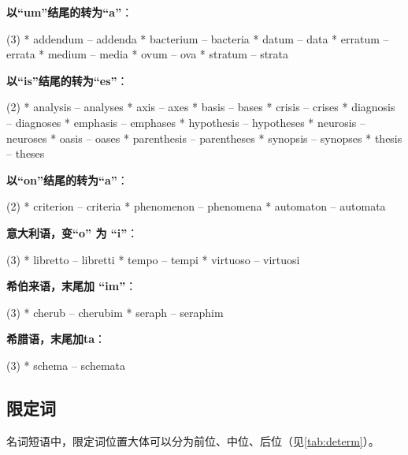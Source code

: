 \begin{description}
  \textbf{以``um''结尾的转为``a''}：
  \begin{taskitem}(3)
    *  addendum -- addenda
    *  bacterium -- bacteria
    *  datum -- data
    *  erratum -- errata
    *  medium -- media
    *  ovum -- ova
    *  stratum -- strata
  \end{taskitem}

  \textbf{以``is''结尾的转为``es''}：
  \begin{taskitem}(2)
    *  analysis -- analyses
    *  axis -- axes
    *  basis -- bases
    *  crisis -- crises
    *  diagnosis -- diagnoses
    *  emphasis -- emphases
    *  hypothesis -- hypotheses
    *  neurosis -- neuroses
    *  oasis -- oases
    *  parenthesis -- parentheses
    *  synopsis -- synopses
    *  thesis -- theses
  \end{taskitem}


  \textbf{以``on''结尾的转为``a''}：
  \begin{taskitem}(2)
    *  criterion -- criteria
    *  phenomenon -- phenomena
    *  automaton -- automata
  \end{taskitem}


  \textbf{意大利语，变``o'' 为 ``i''}：
  \begin{taskitem}(3)
    *  libretto -- libretti
    *  tempo -- tempi
    *  virtuoso -- virtuosi
  \end{taskitem}

  \textbf{希伯来语，末尾加 ``im''}：
  \begin{taskitem}(3)
    *  cherub -- cherubim
    *  seraph -- seraphim
  \end{taskitem}

  \textbf{希腊语，末尾加ta}：
  \begin{taskitem}(3)
    *  schema -- schemata
  \end{taskitem}
\end{description}

\subsection{限定词}
\label{subsec:determin}

名词短语中，限定词位置大体可以分为前位、中位、后位（见\cref{tab:determ}）。

